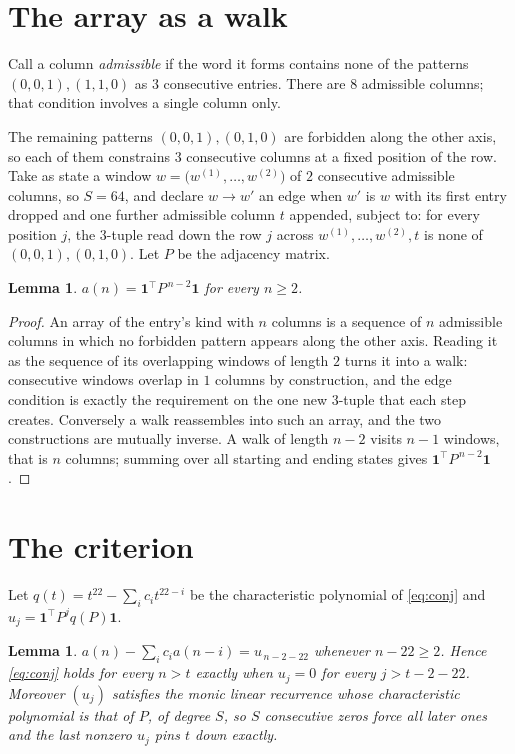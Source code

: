 \documentclass[11pt,a4paper]{article}
\theoremstyle{plain}
\newtheorem{lemma}[theorem]{Lemma}
\theoremstyle{definition}
\begin{document}
\section{The array as a walk}

Call a column \emph{admissible} if the word it forms contains none of the patterns
$(0,0,1), (1,1,0)$ as $3$ consecutive entries. There are $8$ admissible columns; that condition
involves a single column only.

The remaining patterns $(0,0,1), (0,1,0)$ are forbidden along the other axis, so each of them
constrains $3$ consecutive columns at a fixed position of the row. Take as state a
window $w=\bigl(w^{(1)},\dots,w^{(2)}\bigr)$ of $2$ consecutive admissible
columns, so $S=64$, and declare $w\to w'$ an edge when $w'$ is $w$ with its first entry
dropped and one further admissible column $t$ appended, subject to: for every position
$j$, the $3$-tuple read down the row $j$ across $w^{(1)},\dots,w^{(2)},t$
is none of $(0,0,1), (0,1,0)$. Let $P$ be the adjacency matrix.

\begin{lemma}\label{lem:walk}
$a(n)=\mathbf{1}^{\!\top}P^{\,n-2}\mathbf{1}$ for every $n\ge2$.
\end{lemma}

\begin{proof}
An array of the entry's kind with $n$ columns is a sequence of $n$ admissible columns in
which no forbidden pattern appears along the other axis. Reading it as the sequence of its
overlapping windows of length $2$ turns it into a walk: consecutive windows overlap in
$1$ columns by construction, and the edge condition is exactly the requirement on the one
new $3$-tuple that each step creates. Conversely a walk reassembles into such an array,
and the two constructions are mutually inverse. A walk of length $n-2$ visits $n-1$
windows, that is $n$ columns; summing over all starting and ending states gives
$\mathbf{1}^{\!\top}P^{\,n-2}\mathbf{1}$.
\end{proof}

\section{The criterion}

Let $q(t)=t^{22}-\sum_i c_i t^{22-i}$ be the characteristic polynomial of
\eqref{eq:conj} and $u_j=\mathbf{1}^{\!\top}P^{j}q(P)\mathbf{1}$.

\begin{lemma}\label{lem:crit}
$a(n)-\sum_i c_i a(n-i)=u_{\,n-2-22}$ whenever $n-22\ge2$. Hence
\eqref{eq:conj} holds for every $n>t$ exactly when $u_j=0$ for every
$j>t-2-22$. Moreover $(u_j)$ satisfies the monic linear recurrence whose
characteristic polynomial is that of $P$, of degree $S$, so $S$ consecutive zeros force all
later ones and the last nonzero $u_j$ pins $t$ down exactly.
\end{lemma}
\end{document}
